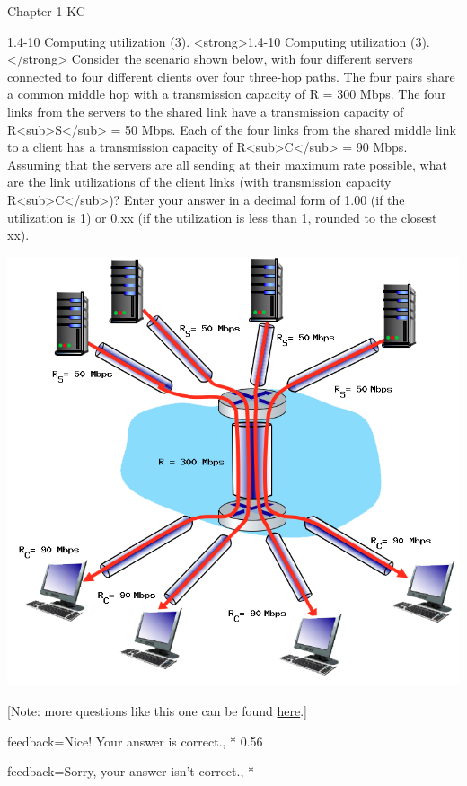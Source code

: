 \documentclass[a4paper]{article}
\begin{document}
\begin{quiz}{Chapter 1 KC}
\begin{shortanswer}[points=1]{1.4-10 Computing utilization (3).}
<strong>1.4-10 Computing utilization (3).</strong> Consider the scenario shown below, with four different servers connected to four different clients over four three-hop paths. The four pairs share a common middle hop with a transmission capacity of R = 300 Mbps. The four links from the servers to the shared link have a transmission capacity of R<sub>S</sub> = 50 Mbps. Each of the four links from the shared middle link to a client has a transmission capacity of R<sub>C</sub> = 90 Mbps. Assuming that the servers are all sending at their maximum rate possible, what are the link utilizations of the client links (with transmission capacity R<sub>C</sub>)? Enter your answer in a decimal form of 1.00 (if the utilization is 1) or 0.xx (if the utilization is less than 1, rounded to the closest xx). 
\begin{center}
\includegraphics[width=\linewidth]{figs/1.4.7.png}
\end{center}
 [Note: more questions like this one can be found \href{http://gaia.cs.umass.edu/kurose_ross/interactive/end-end-throughput-simple.php}{here}.]
\item[feedback={Nice!  Your answer is correct.},]* 0.56
\item[feedback={Sorry, your answer isn't correct.},] *
\end{shortanswer}

\end{quiz}
\end{document}
